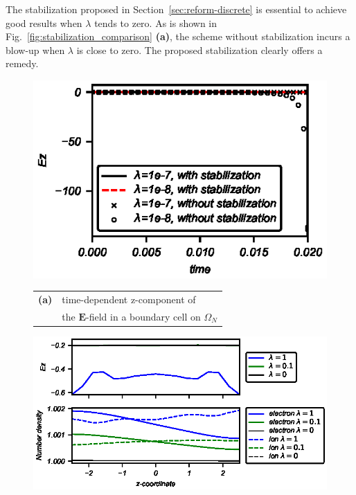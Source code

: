\documentclass{article}
\begin{document}
The stabilization proposed in Section~\ref{sec:reform-discrete} is essential to achieve
good results when $\lambda$ tends to zero. As is shown in
Fig.~\ref{fig:stabilization_comparison} \textbf{(a)}, the scheme without stabilization incurs a blow-up
when $\lambda$ is close to zero. The proposed stabilization clearly offers a remedy.
\begin{figure}
    \centering
\begin{minipage}[t]{0.4\textwidth}\centering
  \includegraphics[width=\textwidth]{stabilizationComparision_stepVoltage.eps}

  \parbox{0.9\textwidth}{\begin{tabular}[c]{ll}
    \textbf{(a)} & time-dependent z-component of \\ & the $\mathbf{E}$-field
    in a boundary cell on $\Omega_N$
  \end{tabular}}
\end{minipage}%
 \begin{minipage}[t]{0.6\textwidth}\centering
   \includegraphics[width=\textwidth]{data-vs-z_stepVoltage.eps}


\end{minipage}
\end{figure}
\end{document}
